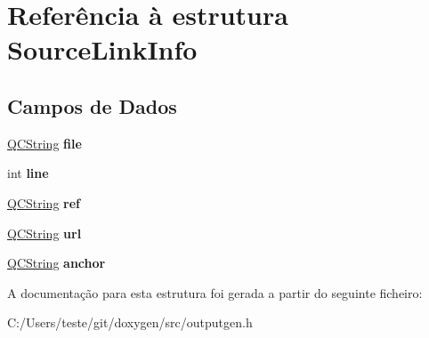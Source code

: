 \hypertarget{struct_source_link_info}{\section{Referência à estrutura Source\-Link\-Info}
\label{struct_source_link_info}
}
\subsection*{Campos de Dados}
\begin{DoxyCompactItemize}
\item 
\hypertarget{struct_source_link_info_afeb3e9dc965e44d291bbce99ea8dbcc7}{\hyperlink{class_q_c_string}{Q\-C\-String} {\bfseries file}}\label{struct_source_link_info_afeb3e9dc965e44d291bbce99ea8dbcc7}

\item 
\hypertarget{struct_source_link_info_a41ebd28ef1d7c6ade45642cb6acc1039}{int {\bfseries line}}\label{struct_source_link_info_a41ebd28ef1d7c6ade45642cb6acc1039}

\item 
\hypertarget{struct_source_link_info_a12b5232acab32ee40a197f72270d4ad1}{\hyperlink{class_q_c_string}{Q\-C\-String} {\bfseries ref}}\label{struct_source_link_info_a12b5232acab32ee40a197f72270d4ad1}

\item 
\hypertarget{struct_source_link_info_ae460a12583d5413f9b10d653d645416e}{\hyperlink{class_q_c_string}{Q\-C\-String} {\bfseries url}}\label{struct_source_link_info_ae460a12583d5413f9b10d653d645416e}

\item 
\hypertarget{struct_source_link_info_a77f4824b029885f469aa2903eabf92d4}{\hyperlink{class_q_c_string}{Q\-C\-String} {\bfseries anchor}}\label{struct_source_link_info_a77f4824b029885f469aa2903eabf92d4}

\end{DoxyCompactItemize}


A documentação para esta estrutura foi gerada a partir do seguinte ficheiro\-:\begin{DoxyCompactItemize}
\item 
C\-:/\-Users/teste/git/doxygen/src/outputgen.\-h\end{DoxyCompactItemize}
